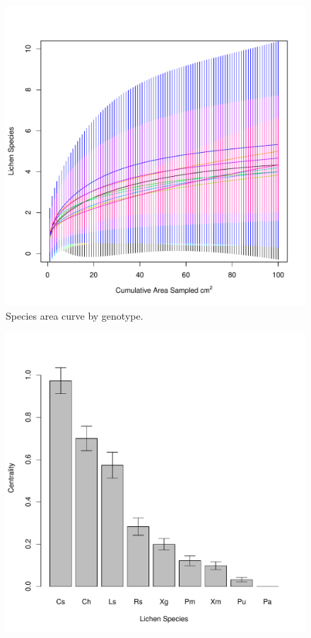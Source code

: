 \documentclass[11pt,twocolumn,twoside,lineno]{pnas-new}
\begin{document}
\begin{figure}[ht]
\centering
\includegraphics[width=\linewidth]{spac_geno.pdf}
\caption{Species area curve by genotype.}
\label{fig:spac_geno_app}
\end{figure}


\begin{figure}[ht]
\centering
\includegraphics[width=\linewidth]{spp_cen.pdf}
\caption{}
\label{fig:spp_cen_app}
\end{figure}


\end{document}
